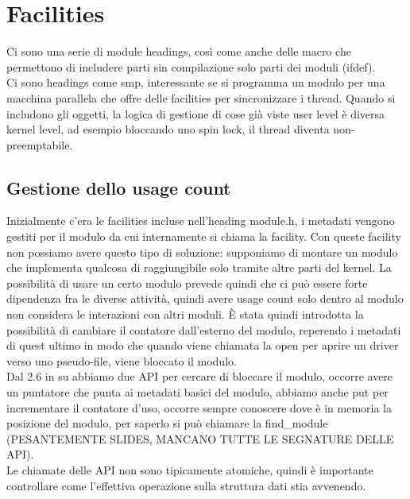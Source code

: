 \documentclass[12pt, oneside]{extbook}
\begin{document}
\section{Facilities}
Ci sono una serie di module headings, così come anche delle macro che permettono di includere parti sin compilazione solo parti dei moduli (ifdef).\\ Ci sono headings come smp, interessante se si programma un modulo per una macchina parallela che offre delle facilities per sincronizzare i thread. Quando si includono gli oggetti, la logica di gestione di cose già viste user level è diversa kernel level, ad esempio bloccando uno spin lock, il thread diventa non-preemptabile.
\subsection{Gestione dello usage count}
Inizialmente c'era le facilities incluse nell'heading module.h, i metadati vengono gestiti per il modulo da cui internamente si chiama la facility. Con queste facility non possiamo avere questo tipo di soluzione: supponiamo di montare un modulo che implementa qualcosa di raggiungibile solo tramite altre parti del kernel. La possibilità di usare un certo modulo prevede quindi che ci può essere forte dipendenza fra le diverse attività, quindi avere usage count solo dentro al modulo non considera le interazioni con altri moduli. È stata quindi introdotta la possibilità di cambiare il contatore dall'esterno del modulo, reperendo i metadati di quest ultimo in modo che quando viene chiamata la open per aprire un driver verso uno pseudo-file, viene bloccato il modulo.\\Dal 2.6 in su abbiamo due API per cercare di bloccare il modulo, occorre avere un puntatore che punta ai metadati basici del modulo, abbiamo anche put per incrementare il contatore d'uso, occorre sempre conoscere dove è in memoria la posizione del modulo, per saperlo si può chiamare la \textsf{find\_module} (PESANTEMENTE SLIDES, MANCANO TUTTE LE SEGNATURE DELLE API).\\Le chiamate delle API non sono tipicamente atomiche, quindi è importante controllare come l'effettiva operazione sulla struttura dati stia avvenendo.
\end{document}
